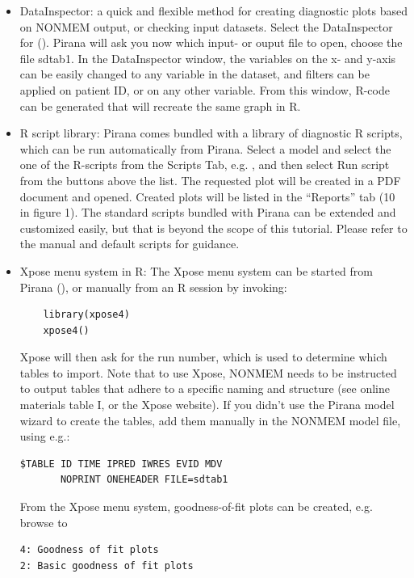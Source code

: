 \begin{itemize}
\item DataInspector: a quick and flexible method for creating
  diagnostic plots based on NONMEM output, or checking input
  datasets. Select the DataInspector for  (). Pirana will
  ask you now which input- or ouput file to open, choose the file
  sdtab1. In the DataInspector window, the variables on the x- and
  y-axis can be easily changed to any variable in the dataset, and
  filters can be applied on patient ID, or on any other variable. From
  this window, R-code can be generated that will recreate the same
  graph in R.
\item R script library: Pirana comes bundled with a library of
  diagnostic R scripts, which can be run automatically from
  Pirana. Select a model and select the one of the R-scripts from the
  Scripts Tab, e.g. , and then
  select Run script from the buttons above the list. The requested
  plot will be created in a PDF document and opened. Created plots
  will be listed in the “Reports” tab (10 in figure 1). The standard
  scripts bundled with Pirana can be extended and customized easily,
  but that is beyond the scope of this tutorial. Please refer to the
  manual and default scripts for guidance.

\item Xpose menu system in R: The Xpose menu system can be started
  from Pirana (), or manually from an R session by
  invoking:
  \begin{lstlisting}
    library(xpose4)
    xpose4()
  \end{lstlisting}

  Xpose will then ask for the run number, which is used to determine
  which tables to import. Note that to use Xpose, NONMEM needs to be
  instructed to output tables that adhere to a specific naming and
  structure (see online materials table I, or the Xpose website). If
  you didn’t use the Pirana model wizard to create the tables, add
  them manually in the NONMEM model file, using e.g.:

\begin{lstlisting}
$TABLE ID TIME IPRED IWRES EVID MDV 
       NOPRINT ONEHEADER FILE=sdtab1
\end{lstlisting}

From the Xpose menu system, goodness-of-fit plots can
be created, e.g. browse to 

\begin{lstlisting}
4: Goodness of fit plots
2: Basic goodness of fit plots
\end{lstlisting}

\end{itemize}

